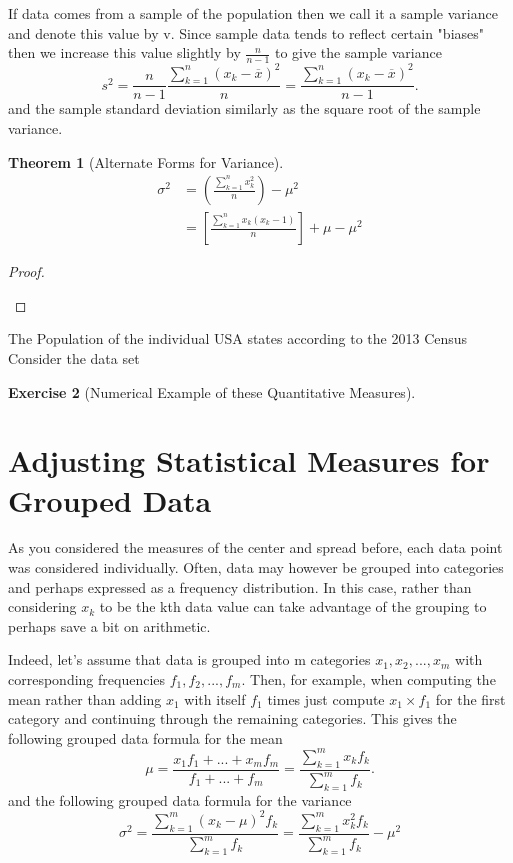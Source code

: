 \documentclass[10pt,]{book}
\theoremstyle{plain}
\newtheorem{theorem}{Theorem}[section]
\theoremstyle{definition}
\theoremstyle{definition}
\theoremstyle{definition}
\newtheorem{exercise}[theorem]{Exercise}
\numberwithin{equation}{section}
\begin{document}
If data comes from a sample of the population then we call it a sample variance and denote this value by v. Since sample data tends to reflect certain "biases" then we increase this value slightly by \(\frac{n}{n-1}\) to give the sample variance
\begin{equation*}s^2 = \frac{n}{n-1}\frac{\sum_{k=1}^n ( x_k-\overline{x} )^2}{n} = \frac{\sum_{k=1}^n ( x_k-\overline{x} )^2}{n-1}.\end{equation*}
and the sample standard deviation similarly as the square root of the sample variance.
%
\begin{theorem}[{Alternate Forms for Variance}]\label{theorem-1}
\begin{align*}
\sigma^2 & = \left ( \frac{\sum_{k=1}^n x_k^2 }{n} \right ) - \mu^2 \\
& = \left [ \frac{\sum_{k=1}^n x_k(x_k - 1)}{n} \right ] + \mu - \mu^2
\end{align*}\end{theorem}
\begin{proof}\hypertarget{proof-1}{}
\end{proof}
\par
The Population of the individual USA states according to the 2013 Census 
Consider the data set {}%
\begin{exercise}[{Numerical Example of these Quantitative Measures}]\label{exercise-1}
\end{exercise}
\typeout{************************************************}
\typeout{************************************************}
\section[{Adjusting Statistical Measures for Grouped Data}]{Adjusting Statistical Measures for Grouped Data}\label{section-6}
As you considered the measures of the center and spread before, each data point was considered individually. Often, data may however be grouped into categories and perhaps expressed as a frequency distribution. In this case, rather than considering \(x_k\) to be the kth data value can take advantage of the grouping to perhaps save a bit on arithmetic.%
\par
Indeed, let's assume that data is grouped into m categories \(x_1, x_2, ..., x_m\) with corresponding frequencies \(f_1, f_2, ..., f_m\). Then, for example, when computing the mean rather than adding \(x_1\) with itself \(f_1\) times just compute \(x_1 \times f_1\) for the first category and continuing through the remaining categories. This gives the following grouped data formula for the mean
		\begin{equation*}
		\mu = \frac{x_1 f_1 + ... + x_m f_m}{f_1 + ... + f_m} = \frac{\sum_{k=1}^m x_k f_k}{\sum_{k=1}^m f_k}.
		\end{equation*}
and the following grouped data formula for the variance
		\begin{equation*} 
		\sigma^2 = \frac{\sum_{k=1}^m ( x_k-\mu )^2 f_k}{\sum_{k=1}^m f_k} = \frac{\sum_{k=1}^m x_k^2 f_k}{\sum_{k=1}^m f_k} - \mu^2
		\end{equation*}
\end{document}
